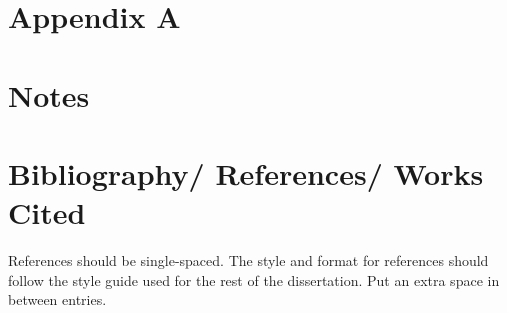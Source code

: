 \documentclass[12pt,oneside, letterpaper]{book}
\begin{document}
\newpage
\chapter*{Appendix A}


\newpage
\chapter*{Notes}

\newpage
{}
\chapter*{Bibliography/ References/ Works Cited}
\fontsize{10}{10pt} \selectfont
References should be single-spaced. The style and format for references should follow the style guide used for the rest of the dissertation. \newline \newline
Put an extra space in between entries.

\end{document}
